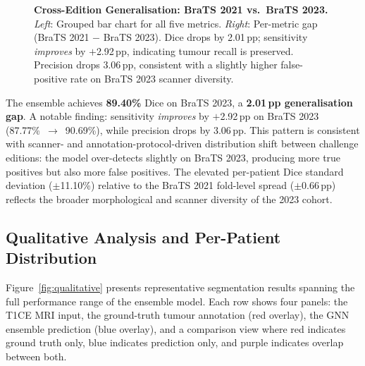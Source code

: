 \documentclass{article}
\begin{document}
\begin{figure}[htbp]
\caption{\textbf{Cross-Edition Generalisation: BraTS 2021 vs.\ BraTS 2023.}
\textit{Left}: Grouped bar chart for all five metrics. \textit{Right}: Per-metric
gap (BraTS 2021 $-$ BraTS 2023). Dice drops by 2.01\,pp; sensitivity
\textit{improves} by $+$2.92\,pp, indicating tumour recall is preserved.
Precision drops 3.06\,pp, consistent with a slightly higher false-positive rate
on BraTS 2023 scanner diversity.}
\label{fig:generalisation}
\end{figure}

The ensemble achieves \textbf{89.40\%} Dice on BraTS 2023, a \textbf{2.01\,pp
generalisation gap}. A notable finding: sensitivity \textit{improves} by
$+$2.92\,pp on BraTS 2023 (87.77\%~$\rightarrow$~90.69\%), while precision drops
by 3.06\,pp. This pattern is consistent with scanner- and annotation-protocol-driven
distribution shift between challenge editions: the model over-detects slightly on
BraTS 2023, producing more true positives but also more false positives. The
elevated per-patient Dice standard deviation ($\pm$11.10\%) relative to the BraTS
2021 fold-level spread ($\pm$0.66\,pp) reflects the broader morphological and
scanner diversity of the 2023 cohort.

\subsection{Qualitative Analysis and Per-Patient Distribution}

Figure~\ref{fig:qualitative} presents representative segmentation results
spanning the full performance range of the ensemble model. Each row shows
four panels: the T1CE MRI input, the ground-truth tumour annotation (red
overlay), the GNN ensemble prediction (blue overlay), and a comparison view
where red indicates ground truth only, blue indicates prediction only, and
purple indicates overlap between both.
\end{document}
